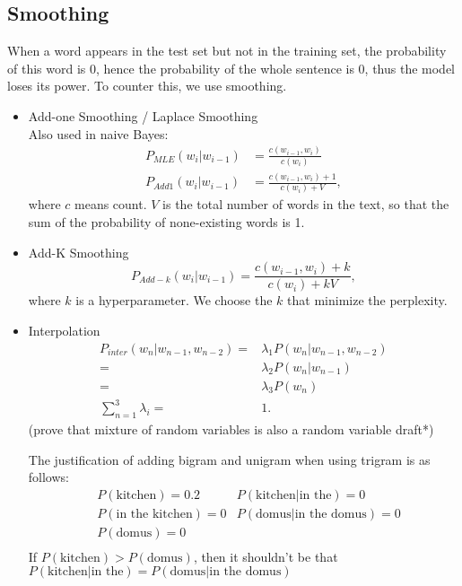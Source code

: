 \documentclass{report}
\begin{document}
\subsection{Smoothing}
When a word appears in the test set but not in the training set, the probability of this word is 0, hence the probability of the whole sentence is 0, thus the model loses its power. To counter this, we use smoothing.
\begin{itemize}
	\item Add-one Smoothing / Laplace Smoothing\\
		Also used in naive Bayes:
	\begin{align*}
		P_{MLE}(w_i | w_{i-1}) &= \frac{c(w_{i-1}, w_i)}{c(w_i)}\\
		P_{Add1}(w_i | w_{i-1}) &= \frac{c(w_{i-1}, w_i) + 1}{c(w_i) + V},
	\end{align*}
	where $c$ means count. $V$ is the total number of words in the text, so that the sum of the probability of none-existing words is 1.
	\item Add-K Smoothing
		\[
		P_{Add-k}(w_i | w_{i-1}) = \frac{c(w_{i-1}, w_i) + k}{c(w_i) + kV}
		,\] 
		where $k$ is a hyperparameter. We choose the $k$ that minimize the perplexity.
	\item Interpolation \\
		\begin{align*}
			P_{inter}(w_n | w_{n-1}, w_{n-2}) =& \lambda_1 P(w_n | w_{n-1}, w_{n-2}) \\
			=& \lambda_2 P(w_n | w_{n-1})\\
			=& \lambda_3 P(w_n)\\
			\sum_{n=1}^{3} \lambda_i =& 1
		.\end{align*}
		(prove that mixture of random variables is also a random variable draft*)

		The justification of adding bigram and unigram when using trigram is as follows:
\begin{align*}
&P(\text{kitchen}) = 0.2 
		   &P(\text{kitchen} | \text{in the}) = 0\\
		   &P(\text{in the kitchen}) = 0
			  &P(\text{domus} | \text{in the domus}) = 0\\
			  &P(\text{domus}) = 0\\
\end{align*}
If $P(\text{kitchen}) > P(\text{domus})$, then it shouldn't be that $P(\text{kitchen} | \text{in the}) = P(\text{domus} | \text{in the domus})$
		
\end{itemize}
\end{document}
